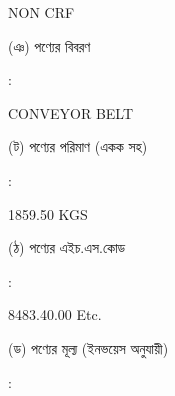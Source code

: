 \documentclass[12pt]{article}
\newcommand{\good}{CONVEYOR BELT}
\newcommand{\pkg}{1859.50 KGS}
\newcommand{\crf}{NON CRF}
\newcommand{\crfdt}{}
\newcommand{\hscode}{8483.40.00 Etc.}
\begin{document}
\begin{minipage}[t]{0.50\linewidth}
{\crf} \hspace{2em} {\crfdt}
\\
\end{minipage}
\begin{minipage}[t]{0.05\linewidth}
\hspace*{1em}
\end{minipage}
\begin{minipage}[t]{0.45\linewidth}
(ঞ) পণ্যের বিবরণ
\end{minipage}
\begin{minipage}[t]{0.02\linewidth}
:
\end{minipage}
\begin{minipage}[t]{0.50\linewidth}
{\good}
\\
\end{minipage}
\begin{minipage}[t]{0.05\linewidth}
\hspace*{1em}
\end{minipage}
\begin{minipage}[t]{0.45\linewidth}
(ট) পণ্যের পরিমাণ (একক সহ)
\end{minipage}
\begin{minipage}[t]{0.02\linewidth}
:
\end{minipage}
\begin{minipage}[t]{0.50\linewidth}
{\pkg}
\\
\end{minipage}
\begin{minipage}[t]{0.05\linewidth}
\hspace*{1em}
\end{minipage}
\begin{minipage}[t]{0.45\linewidth}
(ঠ) পণ্যের এইচ.এস.কোড
\end{minipage}
\begin{minipage}[t]{0.02\linewidth}
:
\end{minipage}
\begin{minipage}[t]{0.50\linewidth}
{\hscode}
\\
\end{minipage}
\begin{minipage}[t]{0.05\linewidth}
\hspace*{1em}
\end{minipage}
\begin{minipage}[t]{0.45\linewidth}
(ড) পণ্যের মূল্য (ইনভয়েস অনুযায়ী)
\end{minipage}
\begin{minipage}[t]{0.02\linewidth}
:
\end{minipage}
\end{document}
